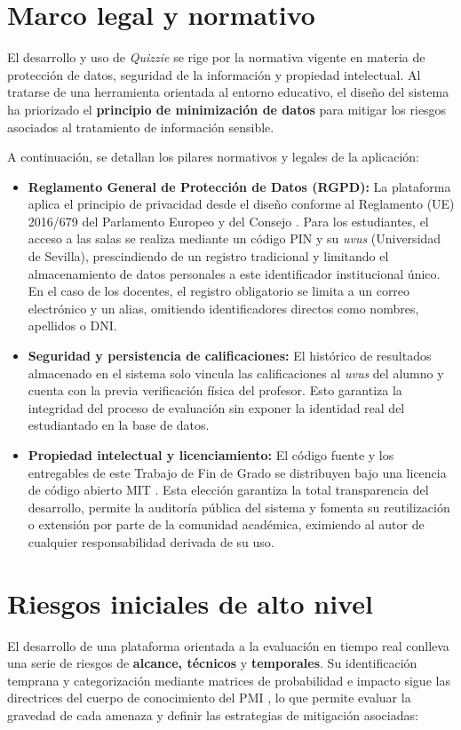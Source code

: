 \section{Marco legal y normativo}\label{sec:marco_legal_y_normativo}

El desarrollo y uso de \textit{Quizzie} se rige por la normativa vigente en materia de protección de datos, seguridad de la información y propiedad intelectual. Al tratarse de una herramienta orientada al entorno educativo, el diseño del sistema ha priorizado el \textbf{principio de minimización de datos} para mitigar los riesgos asociados al tratamiento de información sensible.

A continuación, se detallan los pilares normativos y legales de la aplicación:

\begin{itemize}
    \item \textbf{Reglamento General de Protección de Datos (RGPD):} La plataforma aplica el principio de privacidad desde el diseño conforme al Reglamento (UE) 2016/679 del Parlamento Europeo y del Consejo \cite{gdpr2016}. Para los estudiantes, el acceso a las salas se realiza mediante un código PIN y su \textit{uvus} (Universidad de Sevilla), prescindiendo de un registro tradicional y limitando el almacenamiento de datos personales a este identificador institucional único. En el caso de los docentes, el registro obligatorio se limita a un correo electrónico y un alias, omitiendo identificadores directos como nombres, apellidos o DNI.
    \item \textbf{Seguridad y persistencia de calificaciones:} El histórico de resultados almacenado en el sistema solo vincula las calificaciones al \textit{uvus} del alumno y cuenta con la previa verificación física del profesor. Esto garantiza la integridad del proceso de evaluación sin exponer la identidad real del estudiantado en la base de datos.
    \item \textbf{Propiedad intelectual y licenciamiento:} El código fuente y los entregables de este Trabajo de Fin de Grado se distribuyen bajo una licencia de código abierto MIT \cite{strayer2020open}. Esta elección garantiza la total transparencia del desarrollo, permite la auditoría pública del sistema y fomenta su reutilización o extensión por parte de la comunidad académica, eximiendo al autor de cualquier responsabilidad derivada de su uso.
\end{itemize}

\section{Riesgos iniciales de alto nivel}\label{sec:riesgos_iniciales}
El desarrollo de una plataforma orientada a la evaluación en tiempo real conlleva una serie de riesgos de \textbf{alcance, técnicos} y \textbf{temporales}. Su identificación temprana y categorización mediante matrices de probabilidad e impacto sigue las directrices del cuerpo de conocimiento del PMI \cite{pmi2021pmbok}, lo que permite evaluar la gravedad de cada amenaza y definir las estrategias de mitigación asociadas:

